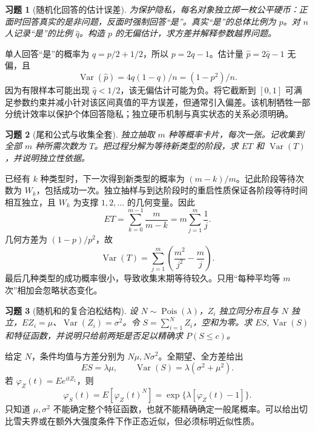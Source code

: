 \documentclass[UTF8,12pt,a4paper,fontset=fandol]{ctexart}
\newtheorem{exercise}{习题}[section]
\begin{document}
\begin{exercise}[随机化回答的估计误差]\label{q:B17.3}
为保护隐私，每名对象独立掷一枚公平硬币：正面时回答真实的是非问题，反面时强制回答“是”。真实“是”的总体比例为 $p$。对 $n$ 人记录“是”的比例 $\widehat q$。构造 $p$ 的无偏估计，求方差并解释参数越界问题。\par{}
\end{exercise}

\begin{solve}\label{a:B17.3}单人回答“是”的概率为 $q=p/2+1/2$，所以 $p=2q-1$。估计量 $\widehat p=2\widehat q-1$ 无偏，且\[\operatorname{Var}(\widehat p)=4q(1-q)/n=(1-p^2)/n.\]因为有限样本可能出现 $\widehat q<1/2$，该无偏估计可能为负。将它截断到 $[0,1]$ 可满足参数约束并减小针对该区间真值的平方误差，但通常引入偏差。该机制牺牲一部分统计效率以保护个体回答隐私；独立硬币机制与真实状态的关系必须明确。\end{solve}

\begin{exercise}[尾和公式与收集全套]\label{q:B17.4}
独立抽取 $m$ 种等概率卡片，每次一张。记收集到全部 $m$ 种所需次数为 $T$。把过程分解为等待新类型的阶段，求 $ET$ 和 $\operatorname{Var}(T)$，并说明独立性依据。\par{}
\end{exercise}

\begin{solve}\label{a:B17.4}已经有 $k$ 种类型时，下一次得到新类型的概率为 $(m-k)/m$。记此阶段等待次数为 $W_k$，包括成功一次。独立抽样与到达阶段时的重启性质保证各阶段等待时间相互独立，且 $W_k$ 为支撑 $1,2,\ldots$ 的几何变量。因此\[ET=\sum_{k=0}^{m-1}\frac{m}{m-k}=m\sum_{j=1}^m\frac1j.\]几何方差为 $(1-p)/p^2$，故\[\operatorname{Var}(T)=\sum_{j=1}^m\left(\frac{m^2}{j^2}-\frac mj\right).\]最后几种类型的成功概率很小，导致收集末期等待较久。只用“每种平均等 $m$ 次”相加会忽略状态变化。\end{solve}

\begin{exercise}[随机和的复合泊松结构]\label{q:B17.5}
设 $N\sim\operatorname{Pois}(\lambda)$，$Z_i$ 独立同分布且与 $N$ 独立，$EZ_i=\mu$、$\operatorname{Var}(Z_i)=\sigma^2$。令 $S=\sum_{i=1}^NZ_i$，空和为零。求 $ES,\operatorname{Var}(S)$ 和特征函数，并说明只给前两矩是否足以精确求 $P(S\le c)$。\par{}
\end{exercise}

\begin{solve}\label{a:B17.5}给定 $N$，条件均值与方差分别为 $N\mu,N\sigma^2$。全期望、全方差给出\[ES=\lambda\mu,\qquad\operatorname{Var}(S)=\lambda(\sigma^2+\mu^2).\]若 $\varphi_Z(t)=Ee^{itZ_1}$，则\[\varphi_S(t)=E[\varphi_Z(t)^N]=\exp\{\lambda[\varphi_Z(t)-1]\}.\]只知道 $\mu,\sigma^2$ 不能确定整个特征函数，也就不能精确确定一般尾概率。可以给出切比雪夫界或在额外大强度条件下作正态近似，但必须标明近似性质。\end{solve}
\end{document}
